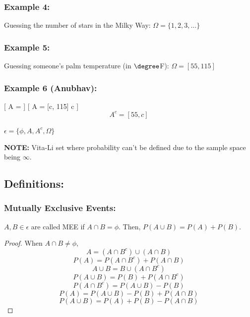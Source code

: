 \documentclass{article}
\theoremstyle{definition}
\begin{document}
\subsubsection{Example 4:}
Guessing the number of stars in the Milky Way: $\Omega = \{1,2,3, \dots \}$

\subsubsection{Example 5:}
Guessing someone's palm temperature (in $\degree $F): $\Omega = [55,115]$

\subsubsection{Example 6 (Anubhav):}
[ A =  ]
[ A = [c, 115]  c ]
\[ A^c = [55, c] \]

$\epsilon = \{\phi, A, A^c, \Omega\}$
\begin{mdframed}[style=MyFrame]
\textbf{NOTE:}
Vita-Li set where probability can't be defined due to the sample space being $\infty$.
\end{mdframed}

\subsection{Definitions:}
\subsubsection{Mutually Exclusive Events:}
$A, B \in \epsilon$ are called MEE if $A \cap B = \phi$.
    Then, $P(A \cup B) = P(A) + P(B)$.
\begin{proof}
     When $A \cap B \neq \phi$,
    \[ A = (A \cap B^c) \cup (A \cap B) \]
    \[ P(A) = P(A \cap B^c) + P(A \cap B) \]
    \[ A \cup B = B \cup (A \cap B^c) \]
    \[ P(A \cup B) = P(B) + P(A \cap B^c) \]
    \[ P(A \cap B^c) = P(A \cup B) - P(B) \]
    \[ P(A) = P(A \cup B) - P(B) + P(A \cap B) \]
    \[ P(A \cup B) = P(A) + P(B) - P(A \cap B) \]
\end{proof}
    
\end{document}
